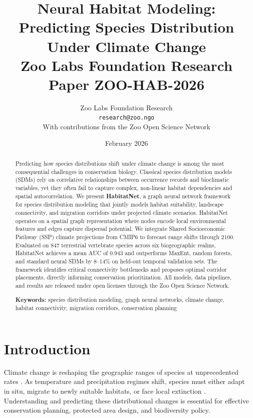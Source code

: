 \documentclass[11pt,a4paper]{article}
\title{%
  \textbf{Neural Habitat Modeling: Predicting Species Distribution\\
  Under Climate Change}\\[0.5em]
  \large Zoo Labs Foundation Research Paper ZOO-HAB-2026
}
\author{
  Zoo Labs Foundation Research\\
  \texttt{research@zoo.ngo}\\[0.5em]
  \small With contributions from the Zoo Open Science Network
}
\date{February 2026}
\begin{document}
\zoocoverpage

\begin{abstract}
\noindent
Predicting how species distributions shift under climate change is among
the most consequential challenges in conservation biology. Classical
species distribution models (SDMs) rely on correlative relationships
between occurrence records and bioclimatic variables, yet they often fail
to capture complex, non-linear habitat dependencies and spatial
autocorrelation. We present \textbf{HabitatNet}, a graph neural network
framework for species distribution modeling that jointly models habitat
suitability, landscape connectivity, and migration corridors under
projected climate scenarios. HabitatNet operates on a spatial graph
representation where nodes encode local environmental features and edges
capture dispersal potential. We integrate Shared Socioeconomic Pathway
(SSP) climate projections from CMIP6 to forecast range shifts through
2100. Evaluated on 847 terrestrial vertebrate species across six
biogeographic realms, HabitatNet achieves a mean AUC of 0.943 and
outperforms MaxEnt, random forests, and standard neural SDMs by
8--14\% on held-out temporal validation sets. The framework identifies
critical connectivity bottlenecks and proposes optimal corridor
placements, directly informing conservation prioritization. All models,
data pipelines, and results are released under open licenses through the
Zoo Open Science Network.

\medskip
\noindent\textbf{Keywords:} species distribution modeling, graph neural
networks, climate change, habitat connectivity, migration corridors,
conservation planning
\end{abstract}

\newpage
\tableofcontents
\newpage

\section{Introduction}
\label{sec:introduction}

Climate change is reshaping the geographic ranges of species at
unprecedented rates \citep{chen2011rapid, pecl2017biodiversity}. As
temperature and precipitation regimes shift, species must either adapt in
situ, migrate to newly suitable habitats, or face local extinction
\citep{urban2015accelerating}. Understanding and predicting these
distributional changes is essential for effective conservation planning,
protected area design, and biodiversity policy.
\end{document}
